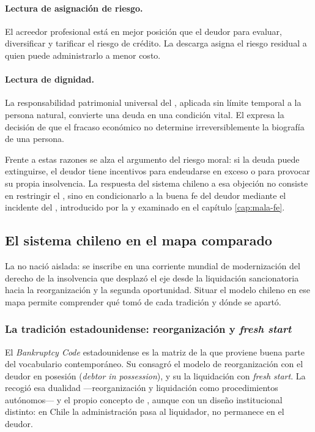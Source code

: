 \paragraph{Lectura de asignación de riesgo.} El acreedor profesional está en mejor
posición que el deudor para evaluar, diversificar y tarificar el riesgo de crédito. La
descarga asigna el riesgo residual a quien puede administrarlo a menor costo.

\paragraph{Lectura de dignidad.} La responsabilidad patrimonial universal del
, aplicada sin límite temporal a la persona natural, convierte una deuda en
una condición vital. El \freshstart{} expresa la decisión de que el fracaso económico no
determine irreversiblemente la biografía de una persona.

\medskip
Frente a estas razones se alza el argumento del riesgo moral: si la deuda puede
extinguirse, el deudor tiene incentivos para endeudarse en exceso o para provocar su
propia insolvencia. La respuesta del sistema chileno a esa objeción no consiste en
restringir el \discharge{}, sino en condicionarlo a la buena fe del deudor mediante el
incidente del , introducido por la \Lreforma{} y examinado en el capítulo
\ref{cap:mala-fe}.

\subsection{El sistema chileno en el mapa comparado}

La \LIR{} \citeyearpar{ley-20720} no nació aislada: se inscribe en una corriente mundial de
modernización del derecho de la insolvencia que desplazó el eje desde la liquidación
sancionatoria hacia la reorganización y la segunda oportunidad. Situar el modelo chileno en ese
mapa permite comprender qué tomó de cada tradición y dónde se apartó.

\subsubsection{La tradición estadounidense: reorganización y \emph{fresh start}}

El \emph{Bankruptcy Code} \parencite{us-bankruptcy-code} estadounidense es la matriz de la que
proviene buena parte del vocabulario contemporáneo. Su  consagró el modelo
de reorganización con el deudor en posesión (\emph{debtor in possession}), y su  la liquidación con \emph{fresh start}. La \LIR{} recogió esa dualidad ---reorganización y
liquidación como procedimientos autónomos--- y el propio concepto de \discharge{}, aunque con un
diseño institucional distinto: en Chile la administración pasa al liquidador, no permanece en el
deudor.

